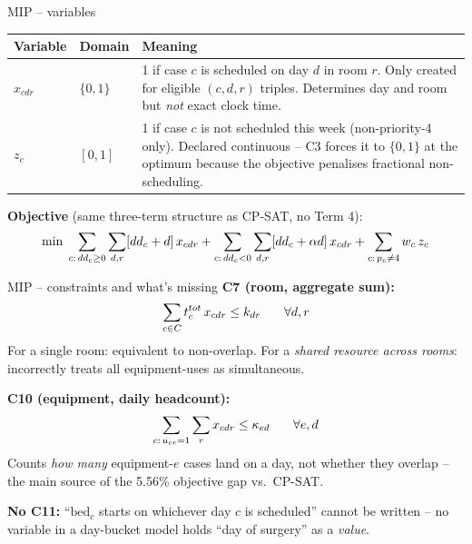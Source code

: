 \documentclass[10pt,aspectratio=169]{beamer}
\newcommand{\bk}{\hfill\hyperlink{toc}{\beamerreturnbutton{Agenda}}}
\begin{document}
\begin{frame}{MIP -- variables}
  \footnotesize
  \begin{center}
  \begin{tabular}{p{2.4cm}p{2.6cm}p{6.6cm}}
    \toprule
    \textbf{Variable} & \textbf{Domain} & \textbf{Meaning} \\
    \midrule
    $x_{cdr}$ & $\{0,1\}$ &
      1 if case $c$ is scheduled on day $d$ in room $r$.
      Only created for eligible $(c,d,r)$ triples.
      Determines day and room but \emph{not} exact clock time. \\[3pt]
    $z_c$ & $[0,1]$ &
      1 if case $c$ is not scheduled this week (non-priority-4 only).
      Declared continuous -- C3 forces it to $\{0,1\}$ at the optimum
      because the objective penalises fractional non-scheduling. \\
    \bottomrule
  \end{tabular}
  \end{center}
  \vspace{0.3em}
  \textbf{Objective} (same three-term structure as CP-SAT, no Term 4):
  \[\footnotesize
    \min\;\sum_{c:\,dd_c\ge0}\sum_{d,r}[dd_c+d]\,x_{cdr}
    +\sum_{c:\,dd_c<0}\sum_{d,r}[dd_c+\alpha d]\,x_{cdr}
    +\sum_{c:\,p_c\ne4}w_c\,z_c
  \]
  \bk
\end{frame}

\begin{frame}{MIP -- constraints and what's missing}
  \textbf{C7 (room, aggregate sum):}
  \[\small
    \sum_{c\in C}t_c^{tot}\,x_{cdr}\le k_{dr}\qquad\forall d,r
  \]
  For a single room: equivalent to non-overlap. For a \emph{shared resource
  across rooms}: incorrectly treats all equipment-uses as simultaneous.

  \textbf{C10 (equipment, daily headcount):}
  \[\small
    \sum_{c:\,u_{ce}=1}\sum_r x_{cdr}\le\kappa_{ed}\qquad\forall e,d
  \]
  Counts \emph{how many} equipment-$e$ cases land on a day, not whether
  they overlap -- the main source of the 5.56\% objective gap vs.\ CP-SAT.

  \textbf{No C11:} ``$\text{bed}_c$ starts on whichever day $c$ is
  scheduled'' cannot be written -- no variable in a day-bucket model
  holds ``day of surgery'' as a \emph{value}.
  \bk
\end{frame}
\end{document}
